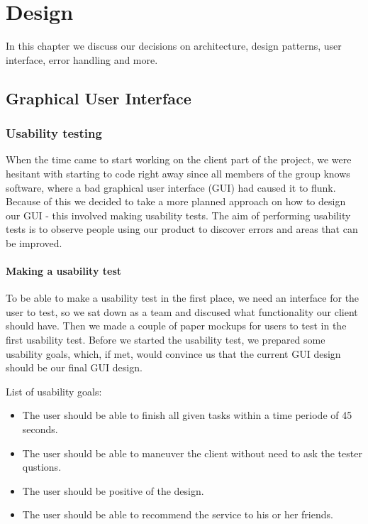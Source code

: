 \chapter{Design}
\label{Design}
In this chapter we discuss our decisions on architecture, design patterns, user interface, error handling and more.

\section{Graphical User Interface}
\label{Design_GUI}
\subsection{Usability testing}
\label{Design_GUI_Usability}
When the time came to start working on the client part of the project, we were hesitant with starting to code right away since all members of the group knows software, where a bad graphical user interface (GUI) had caused it to flunk. Because of this we decided to take a more planned approach on how to design our GUI - this involved making usability tests. The aim of performing usability tests is to observe people using our product to discover errors and areas that can be improved.

\subsubsection{Making a usability test}
\label{Design_GUI_Usability_HowTo}
To be able to make a usability test in the first place, we need an interface for the user to test, so we sat down as a team and discused what functionality our client should have. Then we made a couple of paper mockups for users to test in the first usability test. Before we started the usability test, we prepared some usability goals, which, if met, would convince us that the current GUI design should be our final GUI design.

List of usability goals:
\begin{itemize}
\item The user should be able to finish all given tasks within a time periode of 45 seconds.
\item The user should be able to maneuver the client without need to ask the tester qustions.
\item The user should be positive of the design.
\item The user should be able to recommend the service to his or her friends.
\end {itemize}

